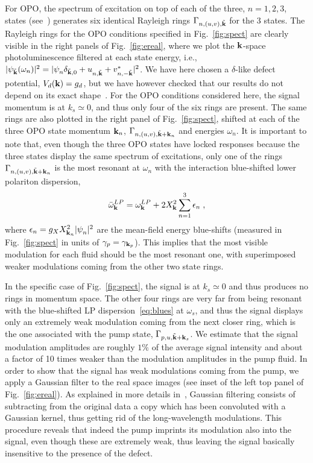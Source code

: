 For OPO, the spectrum of excitation on top of each of the three,
$n=1,2,3$, states (see~\cite{SM}) generates six identical Rayleigh
rings $\Gamma_{n,(u,v), \tilde{{\mathbf k}}}$ for the 3 states.
%
The Rayleigh rings for the OPO conditions specified in
Fig.~\ref{fig:spect} are clearly visible in the right panels of
Fig.~\ref{fig:ereal}, where we plot the ${\mathbf k}$-space
photoluminescence filtered at each state energy, i.e.,
$|\psi_{\tilde{{\mathbf k}}} (\omega_n)|^2= |\psi_{n}^{}
\delta_{\tilde{{\mathbf k}},0} + u_{n,\tilde{{\mathbf k}}}^{} +
v^*_{n,-\tilde{{\mathbf k}}}|^2$.
%
We have here chosen a $\delta$-like defect potential, $V_d({\mathbf k}) =
g_d$, but we have however checked that our results do not depend on
its exact shape~\cite{SM}.
%
For the OPO conditions considered here, the signal momentum is at $k_s
\simeq 0$, and thus only four of the six rings are present. The same
rings are also plotted in the right panel of Fig.~\ref{fig:spect},
shifted at each of the three OPO state momentum ${\mathbf k}_n$,
$\Gamma_{n,(u,v), \tilde{{\mathbf k}}+{\mathbf k}_n}$ and energies
$\omega_n$.
%
It is important to note that, even though the three OPO states have
locked responses because the three states display the same spectrum of
excitations, only one of the rings $\Gamma_{n,(u,v),
  \tilde{{\mathbf k}}+{\mathbf k}_n}$ is the most resonant at $\omega_n$
with the interaction blue-shifted lower polariton dispersion,
%
\begin{equation}
  \bar{\omega}_{{\mathbf k}}^{LP} = \omega_{{\mathbf k}}^{LP} + 2 
  X_{{\mathbf k}}^2 \sum_{n=1}^3  \epsilon_n\; ,
\label{eq:blues}
\end{equation}
%
where $\epsilon_n = g_X X_{{\mathbf k}_n}^2 |\psi_n^{}|^2$ are the
mean-field energy blue-shifts (measured in Fig.~\ref{fig:spect} in
units of $\gamma_p = \gamma_{{\mathbf k}_p}$).  This implies that the
most visible modulation for each fluid should be the most resonant
one, with superimposed weaker modulations coming from the other two
state rings.

In the specific case of Fig.~\ref{fig:spect}, the signal is at $k_s
\simeq 0$ and thus produces no rings in momentum space. The other four
rings are very far from being resonant with the blue-shifted LP
dispersion~\eqref{eq:blues} at $\omega_s$, and thus the signal
displays only an extremely weak modulation coming from the next
closer ring, which is the one associated with the pump state,
$\Gamma_{p,u, \tilde{{\mathbf k}}+{\mathbf k}_s}$.
%
We estimate that the signal modulation amplitudes are roughly $1\%$ of
the average signal intensity and about a factor of 10 times weaker
than the modulation amplitudes in the pump fluid.
%
In order to show that the signal has weak modulations coming from
the pump, we apply a Gaussian filter to the real space images (see
inset of the left top panel of Fig.~\ref{fig:ereal}).
%
As explained in more details in~\cite{SM}, Gaussian filtering consists
of subtracting from the original data a copy which has been
convoluted with a Gaussian kernel, thus getting rid of the
long-wavelength modulations.
%
This procedure reveals that indeed the pump imprints its modulation
also into the signal, even though these are extremely weak, thus
leaving the signal basically insensitive to the presence of the
defect.

